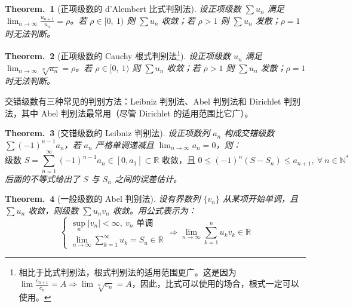 \documentclass[UTF8]{report}
\def\N{\mathbb{N}}
\def\R{\mathbb{R}}
\theoremstyle{MyLineTheoremStyle} %
\newtheorem{LineTheorem}{Theorem.\,}
\theoremstyle{MyBlockTheoremStyle} %
\newtheorem{BlockTheorem}[LineTheorem]{Theorem.\,} %
\theoremstyle{MySubsubsectionStyle} %
\begin{document}
\begin{LineTheorem}[正项级数的 d'Alembert 比式判别法]\label{比式判别法}
    设正项级数 $\sum u_n$ 满足 $\displaystyle \lim_{n \to \infty} \frac{u_{n+1}}{u_n}  = \rho$。若 $\rho \in [0,\ 1)$ 则 $\sum u_n$ 收敛；若 $\rho > 1$ 则 $\sum u_n$ 发散；$\rho = 1$ 时无法判断。
\end{LineTheorem}

\begin{LineTheorem}[正项级数的 Cauchy 根式判别法\footnote{相比于比式判别法，根式判别法的适用范围更广。这是因为 $\lim \frac{c_{n+1}}{c_n} = A \Longrightarrow  \lim \sqrt[n]{c_n} = A$，因此，比式可以使用的场合，根式一定可以使用。}]\label{根式判别法}
    设正项级数 $u_n$ 满足 $\displaystyle \lim_{n \to \infty} \sqrt[n]{u_n}  = \rho$。若 $\rho \in [0,\ 1)$ 则 $\sum u_n$ 收敛；若 $\rho > 1$ 则 $\sum u_n$ 发散；$\rho = 1$ 时无法判断。
\end{LineTheorem}

交错级数有三种常见的判别方法：Leibniz 判别法、Abel 判别法和 Dirichlet 判别法，其中 Abel 判别法最常用（尽管 Dirichlet 的适用范围比它广）。

\begin{BlockTheorem}[交错级数的 Leibniz 判别法]\label{交错级数的 Leibniz 判别法}
设正项数列 $a_n$ 构成交错级数 $\sum (-1)^{n-1}a_n$，若 $a_n$ 严格单调递减且 $\lim_{n \to \infty} a_n = 0$，则：
\begin{equation}
    \text{级数\ } S = \sum_{n=1}^{\infty}(-1)^{n-1}a_n \in [0, a_1] \subset \R \text{\ 收敛，且\ } 0 \leqslant (-1)^n (S - S_n) \leqslant a_{n+1},\ \forall\ n \in \N^*
\end{equation}
后面的不等式给出了 $S$ 与 $S_n$ 之间的误差估计。
\end{BlockTheorem}


\begin{BlockTheorem}[一般级数的 Abel 判别法]\label{一般级数的 Abel 判别法}
    设有界数列 $\{v_n\}$ 从某项开始单调，且 $\sum u_n$ 收敛，则级数 $\sum u_nv_n$ 收敛。用公式表示为：
    \begin{equation}
    \begin{cases}\displaystyle
        \sup_{n} | v_n | < \infty,\ v_n \text{\ 单调} \\ \displaystyle
        \lim_{n\to \infty} \sum_{k=1}^{\infty} u_k = S_u \in \R
    \end{cases}
    \Longrightarrow \lim_{n\to \infty} \sum_{k=1}^{n} u_kv_k \in \R
    \end{equation}
\end{BlockTheorem}
\end{document}
